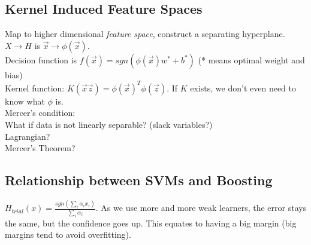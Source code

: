 \documentclass[11pt]{article}
\begin{document}
\subsection{Kernel Induced Feature Spaces}
Map to higher dimensional \textit{feature space}, construct a separating hyperplane. $X \rightarrow H$ is $\vec{x} \rightarrow \phi(\vec{x}).$\\
Decision function is $f(\vec{x}) = sgn (\phi(\vec{x}) w^*+b^*)$ (* means optimal weight and bias)\\
Kernel function: $K(\vec{x} \vec{z}) =\phi(\vec{x})^T\phi(\vec{z})$. If $K$ exists, we don't even need to know what $\phi$ is.\\
Mercer's condition: \\
What if data is not linearly separable? (slack variables?)\\
Lagrangian?\\
Mercer's Theorem? \\

\subsection{Relationship between SVMs and Boosting}
$H_{trial} (x) = \frac{sgn(\sum_i{\alpha_i x_i})}{\sum_i \alpha_i}$. As we use more and more weak learners, the error stays the same, but the confidence goes up. This equates to having a big margin (big margins tend to avoid overfitting). 
\end{document}
